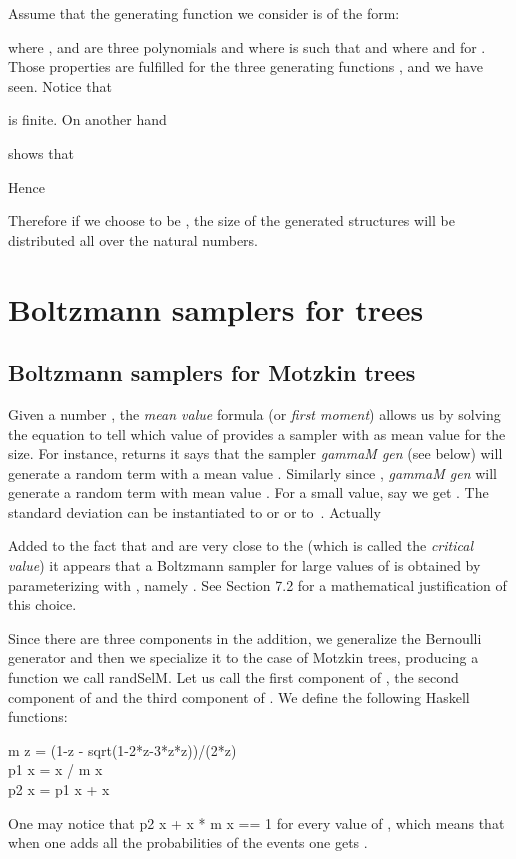 \documentclass{sig-alternate}
\begin{document}
\begin{figure*}[!t]
Assume that the generating function we consider is of the form:

where ,  and  are three polynomials and where  is such that
 and where  and  for .  Those properties are
fulfilled for the three generating functions ,  and  we have
seen.  Notice that 

is finite. On another hand

shows that

Hence 

Therefore if we choose  to be  , the size of the generated structures will
be distributed all over the natural numbers.

\section{Boltzmann samplers for trees}
\label{sec:BoltzmannTree}

\subsection{Boltzmann samplers for Motzkin trees}
\label{sec:Bol-Mot}

Given a number , the \emph{mean value} formula (or \emph{first moment})
 allows us by solving the equation 
to tell which value of  provides a sampler with  as mean value for the size.
For instance,  returns  it says
that the sampler \emph{gammaM gen } (see below) will generate a random term
with a mean value .  Similarly since ,
\emph{gammaM gen } will generate a random term with mean value . For a
small value, say  we get .  The standard deviation
 can be instantiated to  or  or to~.
Actually

Added to the fact that  and  are very close to the 
(which is called the \emph{critical value}) it appears that a Boltzmann sampler
for large values of  is obtained by parameterizing  with , namely
.  See \cite{DBLP:journals/cpc/DuchonFLS04} Section 7.2 for a mathematical
justification of this choice.

Since there are three components in the addition, we generalize the Bernoulli
generator and then we specialize it to the case of Motzkin trees, producing a
function we call \<randSelM\>.  Let us call 
the first component of ,  the
second component of  and  the third component of .  We define the
following \textsf{Haskell} functions:
\begin{haskell}
  m z = (1-z - sqrt(1-2*z-3*z*z))/(2*z) \\
  p1 x = x / m x \\
  p2 x = p1 x + x
\end{haskell}
One may notice that \<p2 x + x * m x == 1\> for every value of , which means that
when one adds all the probabilities of the events one gets .


\end{figure*}
\end{document}
